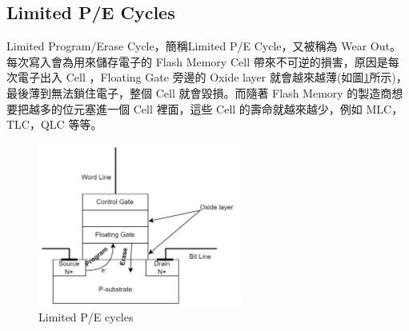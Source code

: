 \subsection{Limited P/E Cycles}\label{s2.1.4}
\indent
Limited Program/Erase Cycle，簡稱Limited P/E Cycle，又被稱為 Wear Out。每次寫入會為用來儲存電子的 Flash Memory Cell 帶來不可逆的損害，原因是每次電子出入 Cell ，Floating Gate 旁邊的 Oxide layer 就會越來越薄(如圖\ref{f2.3}所示)，最後薄到無法鎖住電子，整個 Cell 就會毀損\cite{8631191}。而隨著 Flash Memory 的製造商想要把越多的位元塞進一個 Cell 裡面，這些 Cell 的壽命就越來越少，例如 MLC，TLC，QLC 等等。
\begin{figure}[H]
    \centering
    \includegraphics[width=0.6\textwidth]{picture/ch2/Limited_P-E_Cycles.png}
    \caption{Limited P/E cycles}
    \label{f2.3}
\end{figure}

